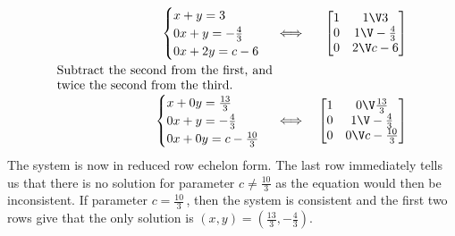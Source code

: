 \begin{example}
\begin{solution}
\begin{eqnarray*}
\begin{cases}
x+y=3\\0x+y=-\frac43\\0x+2y=c-6
\end{cases}
&\iff&%
\begin{bmatrix} 1&1\V3\\0&1\V-\frac43\\0&2\V c-6 \end{bmatrix}
\\
\parbox{0.5\linewidth}{Subtract the second from the first, and twice the second from the third.}
\\
\begin{cases}
x+0y=\frac{13}3\\0x+y=-\frac43\\0x+0y=c-\frac{10}3
\end{cases}
&\iff&%
\begin{bmatrix} 1&0\V\frac{13}3\\0&1\V-\frac43\\0&0\V c-\frac{10}3 \end{bmatrix}
\end{eqnarray*}
The system is now in reduced row echelon form.
The last row immediately tells us that there is no solution for parameter \(c\neq\frac{10}3\) as the equation would then be inconsistent.
If parameter \(c=\frac{10}3\)\,, then the system is consistent and the first two rows give that the only solution is \((x,y)=(\frac{13}3,-\frac43)\).
\end{solution}
\end{example}



